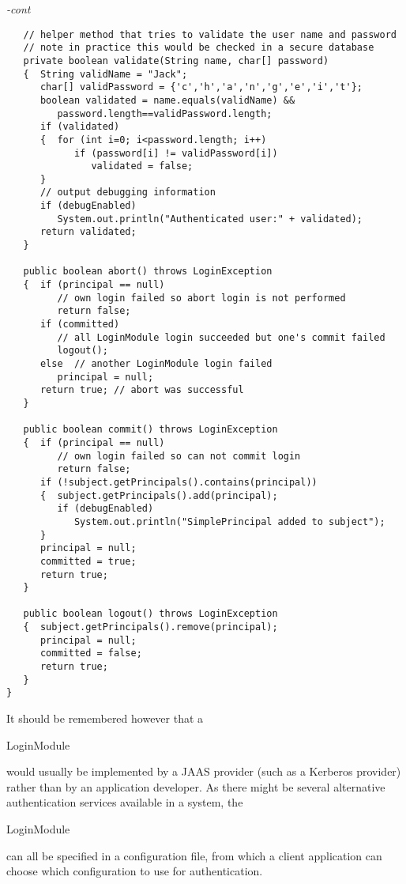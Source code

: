 \begin{figure*}\begin{program}\emph{-cont}\begin{verbatim}
   // helper method that tries to validate the user name and password
   // note in practice this would be checked in a secure database
   private boolean validate(String name, char[] password)
   {  String validName = "Jack";
      char[] validPassword = {'c','h','a','n','g','e','i','t'};
      boolean validated = name.equals(validName) &&
         password.length==validPassword.length;
      if (validated)
      {  for (int i=0; i<password.length; i++)
            if (password[i] != validPassword[i])
               validated = false;
      }
      // output debugging information
      if (debugEnabled)
         System.out.println("Authenticated user:" + validated);
      return validated;
   }

   public boolean abort() throws LoginException
   {  if (principal == null)
         // own login failed so abort login is not performed
         return false;
      if (committed)
         // all LoginModule login succeeded but one's commit failed
         logout();
      else  // another LoginModule login failed
         principal = null;
      return true; // abort was successful
   }

   public boolean commit() throws LoginException
   {  if (principal == null)
         // own login failed so can not commit login
         return false;
      if (!subject.getPrincipals().contains(principal))
      {  subject.getPrincipals().add(principal);
         if (debugEnabled)
            System.out.println("SimplePrincipal added to subject");
      }
      principal = null;
      committed = true;
      return true;
   }

   public boolean logout() throws LoginException
   {  subject.getPrincipals().remove(principal);
      principal = null;
      committed = false;
      return true;
   }
}
\end{verbatim}\end{program}\end{figure*}
It should be remembered however that a \begin{code}LoginModule\end{code}
would usually be implemented by a JAAS provider (such as a Kerberos provider)
rather than by an application developer.
As there might be several alternative authentication services available in a system,
the \begin{code}LoginModule\end{code} can all be specified in a configuration file,
from which a client application can choose which configuration to use
for authentication.

